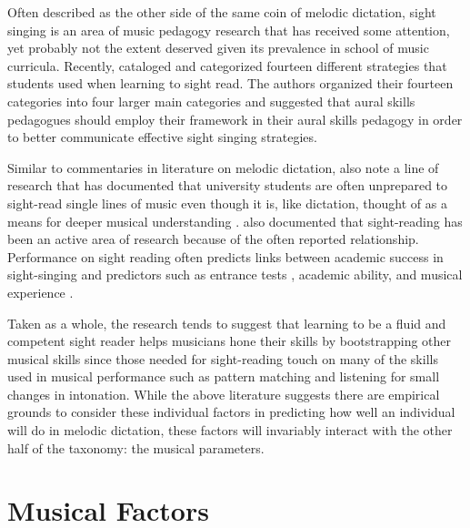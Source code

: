 \documentclass[12pt,]{book}
\begin{document}
Often described as the other side of the same coin of melodic dictation, sight singing is an area of music pedagogy research that has received some attention, yet probably not the extent deserved given its prevalence in school of music curricula.
Recently, \citet{fournierCognitiveStrategiesSightsinging2017a} cataloged and categorized fourteen different strategies that students used when learning to sight read.
The authors organized their fourteen categories into four larger main categories and suggested that aural skills pedagogues should employ their framework in their aural skills pedagogy in order to better communicate effective sight singing strategies.

Similar to commentaries in literature on melodic dictation, \citet{fournierCognitiveStrategiesSightsinging2017a} also note a line of research that has documented that university students are often unprepared to sight-read single lines of music \citep{asmusMusicTeachingMusic2004, thompsonPitchInternalizationStrategies2003} even though it is, like dictation, thought of as a means for deeper musical understanding \citep{karpinskiAuralSkillsAcquisition2000, rogersTeachingApproachesMusic2004}.
\citet{fournierCognitiveStrategiesSightsinging2017a} also documented that sight-reading has been an active area of research because of the often reported relationship.
Performance on sight reading often predicts links between academic success in sight-singing and predictors such as entrance tests \citep{harrisonValidityMusicalAptitude1987}, academic ability, and musical experience \citep{harrisonEffectsMusicalAptitude1994}.

Taken as a whole, the research tends to suggest that learning to be a fluid and competent sight reader helps musicians hone their skills by bootstrapping other musical skills since those needed for sight-reading touch on many of the skills used in musical performance such as pattern matching and listening for small changes in intonation.
While the above literature suggests there are empirical grounds to consider these individual factors in predicting how well an individual will do in melodic dictation, these factors will invariably interact with the other half of the taxonomy: the musical parameters.

\hypertarget{musical-factors}{%
\section{Musical Factors}\label{musical-factors}}
\end{document}
